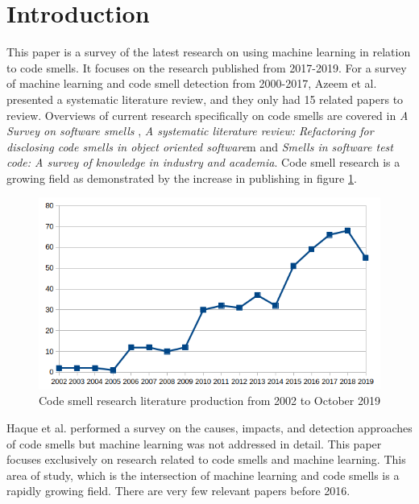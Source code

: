 \documentclass[conference]{IEEEtran}
\begin{document}
\section{Introduction}
This paper is a survey of the latest research on using machine learning in relation to code smells. It focuses on the research published from 2017-2019. For a survey of machine learning and code smell detection from 2000-2017, Azeem et al. presented a systematic literature review\cite{azeem_machine_2019}, and they only had 15 related papers to review. Overviews of current research specifically on code smells are covered in \textit{A Survey on software smells} \cite{sharma_survey_2018}, \textit{A systematic literature review: Refactoring for disclosing code smells in object oriented software}\cite{singh_systematic_2018}m and \textit{Smells in software test code: A survey of knowledge in industry and
academia}\cite{garousi_smells_2018}. 
Code smell research is a growing field\cite{kokol_code_2018} as demonstrated by the increase in publishing in figure \ref{fig:smellresearch}.
\begin{figure}[!ht]
  \centerline{\includegraphics[width=\textwidth]{graph2.png}}
  \caption{Code smell research literature production from 2002 to October 2019\cite{kokol_code_2018}}
  \label{fig:smellresearch}
\end{figure} 
Haque et al.\cite{haque_causes_2018} performed a survey on the causes, impacts, and detection approaches of code smells but machine learning was not addressed in detail. 
This paper focuses exclusively on research related to code smells and machine learning.
This area of study, which is the intersection of machine learning and code smells is a rapidly growing field. There are very few relevant papers before 2016.
\end{document}
